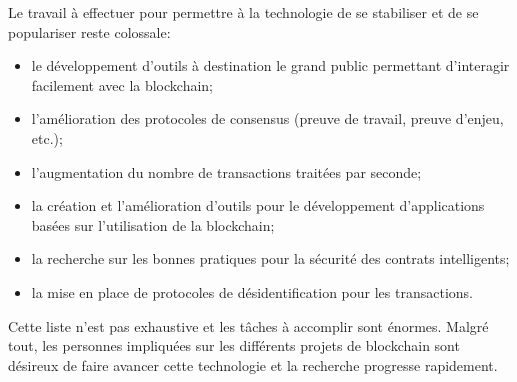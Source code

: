 \documentclass{tnreport}
\begin{document}
Le travail à effectuer pour permettre à la technologie de se stabiliser et de se populariser reste colossale:
\begin{itemize}
	\item le développement d'outils à destination le grand public permettant d'interagir facilement avec la blockchain;
	\item l'amélioration des protocoles de consensus (preuve de travail, preuve d'enjeu, etc.);
	\item l'augmentation du nombre de transactions traitées par seconde;
	\item la création et l'amélioration d'outils pour le développement d'applications basées sur l'utilisation de la blockchain;
	\item la recherche sur les bonnes pratiques pour la sécurité des contrats intelligents;
	\item la mise en place de protocoles de désidentification pour les transactions.
	\newline
\end{itemize}
Cette liste n'est pas exhaustive et les tâches à accomplir sont énormes.
Malgré tout, les personnes impliquées sur les différents projets de blockchain sont désireux de faire avancer cette technologie et la recherche progresse rapidement.
\end{document}
